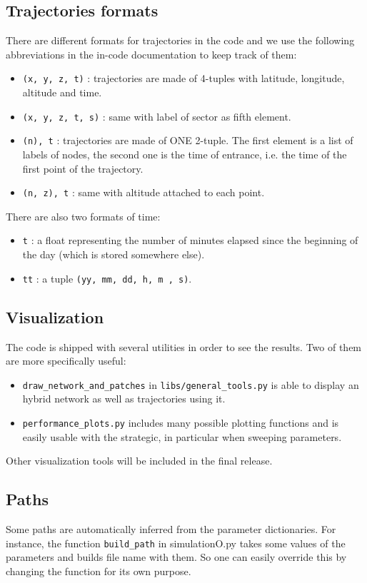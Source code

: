 \documentclass[12pt]{article}
\begin{document}
\subsection{Trajectories formats}

There are different formats for trajectories in the code and we use the following abbreviations in the in-code documentation to keep track of them:
\begin{itemize}
\item  \verb|(x, y, z, t)| : trajectories are made of 4-tuples with latitude, longitude, altitude and 
time.
\item \verb|(x, y, z, t, s)| : same with label of sector as fifth element.
\item \verb|(n), t| : trajectories are made of ONE 2-tuple. The first element is a list of labels
of nodes, the second one is the time of entrance, i.e. the time of the first point of the trajectory.
\item \verb|(n, z), t| : same with altitude attached to each point.
\end{itemize}
There are also two formats of time:
\begin{itemize}
\item \verb|t| : a float representing the number of minutes elapsed since the beginning of 
the day (which is stored somewhere else).
\item \verb|tt| : a tuple \verb|(yy, mm, dd, h, m , s)|.
\end{itemize}

\subsection{Visualization}

The code is shipped with several utilities in order to see the results. Two of them are more specifically useful:
\begin{itemize}
\item \verb|draw_network_and_patches| in \verb|libs/general_tools.py| is able to display an hybrid network as well as trajectories using it.
\item \verb|performance_plots.py| includes many possible plotting functions and is easily usable with the strategic, in particular when sweeping parameters. 
\end{itemize}
Other visualization tools will be included in the final release.

\subsection{Paths}
Some paths are automatically inferred from the parameter dictionaries. For instance, the function \verb|build_path| in simulationO.py takes some values of the parameters and builds file name with them. So one can easily override this by changing the function for its own purpose.
\end{document}
